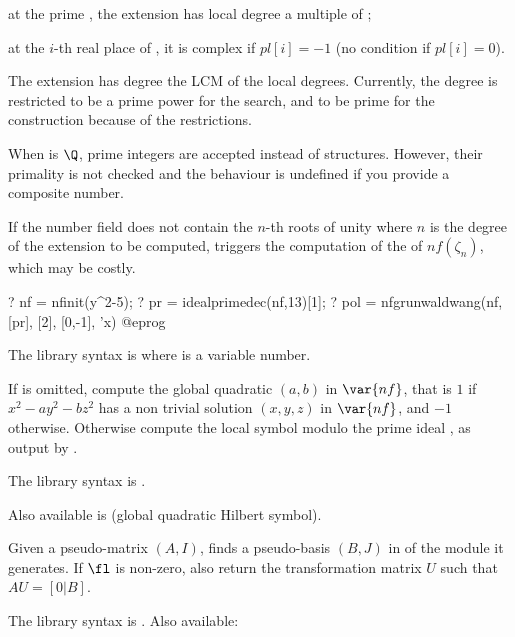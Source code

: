 \item at the prime , the extension has local degree a multiple of
;

\item at the $i$-th real place of , it is complex if $pl[i]=-1$
(no condition if $pl[i]=0$).

The extension has degree the LCM of the local degrees. Currently, the degree
is restricted to be a prime power for the search, and to be prime for the
construction because of the  restrictions.

When  is $\Q$, prime integers are accepted instead of 
structures. However, their primality is not checked and the behaviour is
undefined if you provide a composite number.

 If the number field  does not contain the $n$-th
roots of unity where $n$ is the degree of the extension to be computed,
triggers the computation of the  of $nf(\zeta_n)$, which may be
costly.

\bprog
? nf = nfinit(y^2-5);
? pr = idealprimedec(nf,13)[1];
? pol = nfgrunwaldwang(nf, [pr], [2], [0,-1], 'x)
@eprog

The library syntax is  where  is a variable number.

\label{se:nfhilbert}
If  is omitted,
compute the global quadratic  $(a,b)$ in $\var{nf}$, that
is $1$ if $x^2 - a y^2 - b z^2$ has a non trivial solution $(x,y,z)$ in
$\var{nf}$, and $-1$ otherwise. Otherwise compute the local symbol modulo
the prime ideal , as output by .

The library syntax is .

Also available is  (global
quadratic Hilbert symbol).

\label{se:nfhnf}
Given a pseudo-matrix $(A,I)$, finds a
pseudo-basis $(B,J)$ in  of the module it generates.
If $\fl$ is non-zero, also return the transformation matrix $U$ such that
$AU = [0|B]$.

The library syntax is .
Also available:

